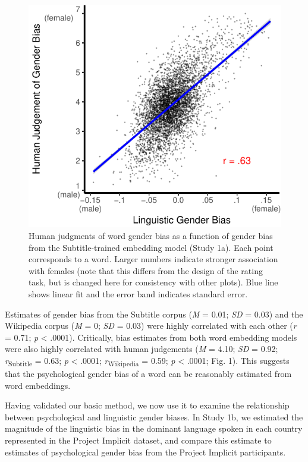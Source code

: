 \documentclass[9pt,twocolumn,twoside,lineno]{pnas-new}
\begin{document}
\begin{figure}
\centering
\includegraphics[width=.8\linewidth]{pnas_rmd/iat_lang_pnas_files/figure-latex/unnamed-chunk-10-1.pdf}
\caption{\label{fig:unnamed-chunk-10}Human judgments of word gender bias as
a function of gender bias from the Subtitle-trained embedding model
(Study 1a). Each point corresponds to a word. Larger numbers indicate
stronger association with females (note that this differs from the
design of the rating task, but is changed here for consistency with
other plots). Blue line shows linear fit and the error band indicates
standard error.}
\end{figure}

Estimates of gender bias from the Subtitle corpus (\emph{M} = 0.01;
\emph{SD} = 0.03) and the Wikipedia corpus (\emph{M} = 0; \emph{SD} =
0.03) were highly correlated with each other (\emph{r} = 0.71; \emph{p}
\textless{} .0001). Critically, bias estimates from both word embedding
models were also highly correlated with human judgements (\emph{M} =
4.10; \emph{SD} = 0.92; \emph{r}\textsubscript{Subtitle} = 0.63;
\emph{p} \textless{} .0001; \emph{r}\textsubscript{Wikipedia} = 0.59;
\emph{p} \textless{} .0001; Fig. 1). This suggests that the
psychological gender bias of a word can be reasonably estimated from
word embeddings.


Having validated our basic method, we now use it to examine the relationship
between psychological and linguistic gender biases. In Study 1b, we
estimated the magnitude of the linguistic bias in the dominant language
spoken in each country represented in the Project Implicit dataset, and
compare this estimate to estimates of psychological gender bias from the
Project Implicit participants.
\end{document}
